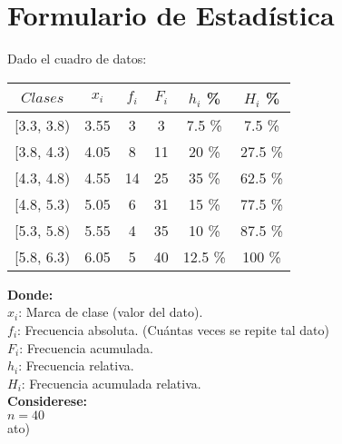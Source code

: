 \documentclass[11pt, a4paper]{article}
\begin{document}
\section{Formulario de Estadística}
\begin{multicols}{2}
    Dado el cuadro de datos:
    \begin{center}
        \begin{tabular}{|c|c|c|c|c|c|}
            \hline
            $Clases$ & $x_i$ & $f_i$ & $F_i$ & $h_i$ \% & $H_i$ \% \\
            \hline
            [3.3, 3.8) & 3.55 & 3  & 3  & 7.5 \%  & 7.5 \%  \\

            [3.8, 4.3) & 4.05 & 8  & 11 & 20 \%   & 27.5 \% \\

            [4.3, 4.8) & 4.55 & 14 & 25 & 35 \%   & 62.5 \% \\

            [4.8, 5.3) & 5.05 & 6  & 31 & 15 \%   & 77.5 \% \\

            [5.3, 5.8) & 5.55 & 4  & 35 & 10 \%   & 87.5 \% \\

            [5.8, 6.3) & 6.05 & 5  & 40 & 12.5 \% & 100 \%  \\
            \hline
        \end{tabular}
    \end{center}
    \textbf{Donde:} \\
        $x_i$: Marca de clase (valor del dato). \\
        $f_i$: Frecuencia absoluta. (Cuántas veces se repite tal dato)\\
        $F_i$: Frecuencia acumulada. \\
        $h_i$: Frecuencia relativa. \\
        $H_i$: Frecuencia acumulada relativa. \\
    \textbf{Considerese:} \\
        $n = 40$  \\ato)\\
\end{multicols}
\end{document}
